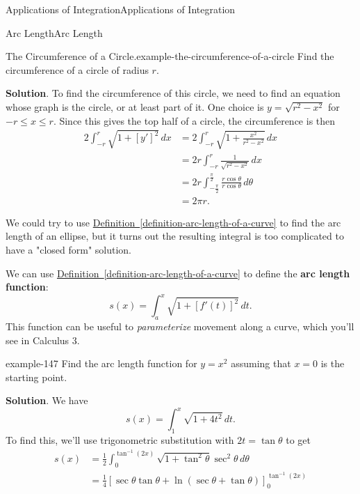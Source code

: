 \documentclass[10pt,]{book}
\newcommand{\terminology}[1]{\textbf{#1}}
\numberwithin{equation}{section}
\newcommand{\amp}{&}
\begin{document}
\begin{chapterptx}{Applications of Integration}{}{Applications of Integration}{}{}
\begin{sectionptx}{Arc Length}{}{Arc Length}{}{}
\begin{example}{The Circumference of a Circle.}{example-the-circumference-of-a-circle}
\hypertarget{p-655}{}%
Find the circumference of a circle of radius \(r\).%
\par\smallskip%
\noindent\textbf{Solution}.\hypertarget{solution-142}{}\quad%
\hypertarget{p-656}{}%
To find the circumference of this circle, we need to find an equation whose graph is the circle, or at least part of it. One choice is \(y = \sqrt{r^{2} - x^{2}}\) for \(-r\leq x\leq r\). Since this gives the top half of a circle, the circumference is then%
\begin{align*}
2\int_{-r}^{r}\sqrt{1 + [y']^{2}}\,dx \amp = 2\int_{-r}^{r}\sqrt{1 + \frac{x^{2}}{r^{2} - x^{2}}}\,dx \\
\amp = 2r\int_{-r}^{r}\frac{1}{\sqrt{r^{2} - x^{2}}}\,dx \\
\amp = 2r\int_{-\frac{\pi}{2}}^{\frac{\pi}{2}}\frac{r\cos\theta}{r\cos\theta}\,d\theta \\
\amp = 2\pi r. 
\end{align*}
%
\end{example}
\hypertarget{p-657}{}%
We could try to use \hyperref[definition-arc-length-of-a-curve]{Definition~\ref{definition-arc-length-of-a-curve}} to find the arc length of an ellipse, but it turns out the resulting integral is too complicated to have a "closed form" solution.%
\par
\hypertarget{p-658}{}%
We can use \hyperref[definition-arc-length-of-a-curve]{Definition~\ref{definition-arc-length-of-a-curve}} to define the \terminology{arc length function}:%
\begin{equation*}
s(x) = \int_{a}^{x}\sqrt{1 + [f'(t)]^{2}}\,dt.
\end{equation*}
This function can be useful to \emph{parameterize} movement along a curve, which you'll see in Calculus 3.%
\begin{example}{}{example-147}%
\hypertarget{p-659}{}%
Find the arc length function for \(y = x^{2}\) assuming that \(x = 0\) is the starting point.%
\par\smallskip%
\noindent\textbf{Solution}.\hypertarget{solution-143}{}\quad%
\hypertarget{p-660}{}%
We have%
\begin{equation*}
s(x) = \int_{1}^{x}\sqrt{1 + 4t^{2}}\,dt.
\end{equation*}
To find this, we'll use trigonometric substitution with \(2t = \tan\theta\) to get%
\begin{align*}
s(x) \amp = \frac{1}{2}\int_{0}^{\tan^{-1}(2x)}\sqrt{1 + \tan^{2}\theta}\sec^{2}\theta\,d\theta \\
\amp = \frac{1}{4}\left[\sec\theta\tan\theta + \ln(\sec\theta + \tan\theta)\right]_{0}^{\tan^{-1}(2x)} \\

\end{align*}
\end{example}
\end{sectionptx}
\end{chapterptx}
\end{document}
